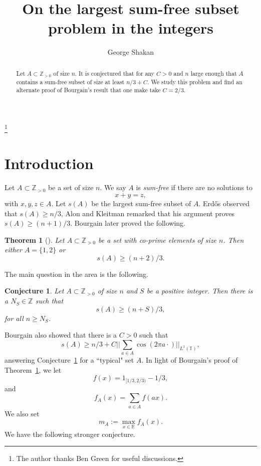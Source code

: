 \documentclass[12pt,reqno]{amsart}
\theoremstyle{dotless}
\newtheorem{thm}{Theorem}
\newtheorem{conj}{Conjecture}
\begin{document}
 


 



 \setcounter{page}{1}

\title{On the largest sum-free subset problem in the integers}

\author{George Shakan}

 
 \thanks{The author thanks Ben Green for useful discussions.}
\address{Department of Mathematics \\
Universit\'e de Montr\'eal }    


\begin{abstract}
Let $A \subset \mathbb{Z}_{>0}$ of size $n$. It is conjectured that for any $C >0$ and $n$ large enough that $A$ contains a sum-free subset of size at least $n/3 +C$. We study this problem and find an alternate proof of Bourgain's result that one make take $C=2/3$. 
\end{abstract}

\maketitle



\section{Introduction}

Let $A \subset \mathbb{Z}_{> 0}$ be a set of size $n$. We say $A$ is {\it sum-free} if there are no solutions to 
$$x+y = z,$$
with $x,y,z \in A$. Let $s(A)$ be the largest sum-free subset of $A$. Erd\H{o}s \cite{Er} observed that $s(A) \geq n/3$, Alon and Kleitman \cite{AK} remarked that his argument proves $s(A) \geq (n+1)/3$. Bourgain later proved the following.

\begin{thm}[\cite{B}]\label{2} Let $A \subset \mathbb{Z}_{>0}$ be a set with co-prime elements of size $n$. Then either $A = \{1,2\}$ or 
$$s(A) \geq (n+2)/3.$$
\end{thm}
The main question in the area is the following.

\begin{conj}\label{MC} 
Let $A \subset \mathbb{Z}_{>0}$ of size $n$ and $S$ be a positive integer. Then there is a $N_S \in \mathbb{Z}$ such that
$$s(A) \geq (n+S)/3,$$
for all $n \geq N_S$.  
\end{conj} 
Bourgain \cite{B} also showed that there is a $C > 0$ such that 
\begin{equation}\label{l1} s(A) \geq n/3 + C ||\sum_{a \in A} \cos(2\pi a \cdot)||_{L^1(\mathbb{T})},\end{equation}
answering Conjecture~\ref{MC} for a ``typical" set $A$. In light of Bourgain's proof of Theorem~\ref{2}, we let 
$$f(x) = 1_{[1/3 , 2/3)} - 1/3,$$
and 
$$f_A(x) = \sum_{a \in A} f(ax).$$
We also set 
$$m_A := \max_{x \in \mathbb{R}} f_A(x).$$
We have the following stronger conjecture.
\end{document}
